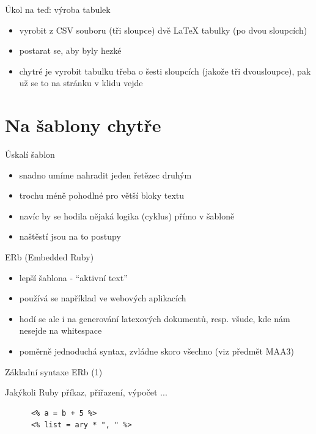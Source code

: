 \documentclass{beamer}
\begin{document}
\begin{frame}{Úkol na teď: výroba tabulek}
  \begin{itemize}
    \item vyrobit z CSV souboru (tři sloupce) dvě LaTeX tabulky (po dvou sloupcích)
    \item postarat se, aby byly hezké
    \item chytré je vyrobit tabulku třeba o šesti sloupcích (jakože tři dvousloupce), pak už se to na stránku v klidu vejde
  \end{itemize}
\end{frame}

%
%
%
%


\section{Na šablony chytře}

\begin{frame}{Úskalí šablon}
  \begin{itemize}
    \item snadno umíme nahradit jeden řetězec druhým
    \item trochu méně pohodlné pro větší bloky textu
    \item navíc by se hodila nějaká logika (cyklus) přímo v šabloně
    \item naštěstí jsou na to postupy
  \end{itemize}
\end{frame}

\begin{frame}{ERb (Embedded Ruby)}
  \begin{itemize}
    \item lepší šablona - ``aktivní text''
    \item používá se například ve webových aplikacích
    \item hodí se ale i na generování latexových dokumentů, resp. všude, kde nám nesejde na whitespace
    \item poměrně jednoduchá syntax, zvládne skoro všechno (viz předmět MAA3)
  \end{itemize}
\end{frame}


\begin{frame}[fragile]{Základní syntaxe ERb (1)}
  \begin{block}{ }
    Jakýkoli Ruby příkaz, přiřazení, výpočet ...
    \scriptsize
    \begin{verbatim}
      <% a = b + 5 %>
      <% list = ary * ", " %>
    \end{verbatim}
  \end{block}
\end{frame}
\end{document}
